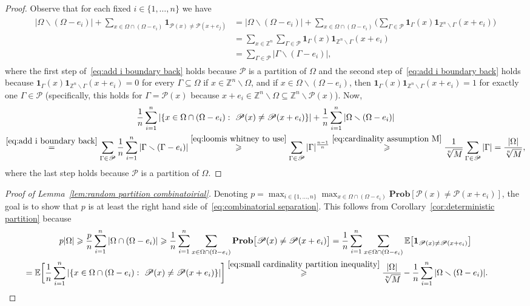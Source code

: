 \documentclass[11pt,reqno]{amsart}
\renewcommand{\ge}{\geqslant}
\renewcommand{\setminus}{\smallsetminus}
\newcommand{\n}{\{1,\ldots,n\}}
\theoremstyle{remark}
\renewcommand{\subset}{\subseteq}
\newcommand{\E}{\mathbb{ E}}
\newcommand{\Z}{\mathbb Z}
\renewcommand{\Pr}{\mathbf{Prob}}
\renewcommand{\1}{\mathbf 1}
\newcommand{\Part}{\mathscr{P}}
\begin{document}
\begin{proof} Observe that for each fixed $i\in \n$ we have
\begin{align}\label{eq:add i boundary back}
\begin{split}
|\Omega\setminus(\Omega-e_i)|+\sum_{x\in \Omega\cap (\Omega-e_i)} \1_{\Part(x)\neq \Part(x+e_j)}&=|\Omega\setminus(\Omega-e_i)|+\sum_{x\in \Omega\cap (\Omega-e_i)} \bigg(\sum_{\Gamma\in \Part} \1_\Gamma(x)\1_{\Z^n\setminus \Gamma}(x+e_i)\bigg)\\&= \sum_{x\in \Z^n} \sum_{\Gamma\in \Part} \1_\Gamma(x)\1_{\Z^n\setminus \Gamma}(x+e_i)\\&=\sum_{\Gamma\in \Part}|\Gamma\setminus(\Gamma-e_i)|,
\end{split}
\end{align}
where the first step of~\eqref{eq:add i boundary back} holds because $\Part$ is a partition of $\Omega$ and  the second step of~\eqref{eq:add i boundary back} holds because $\1_\Gamma(x)\1_{\Z^n\setminus \Gamma}(x+e_i)=0$ for every $\Gamma\subset \Omega$ if $x\in \Z^n\setminus \Omega$, and if $x\in \Omega\setminus(\Omega-e_i)$, then  $\1_\Gamma(x)\1_{\Z^n\setminus \Gamma}(x+e_i)=1$ for exactly one $\Gamma\in \Part$ (specifically, this holds for $\Gamma=\Part(x)$ because   $x+e_i\in \Z^n\setminus \Omega\subset \Z^n\setminus \Part(x)$). Now,
\begin{multline*}
\frac{1}{n}\sum_{i=1}^n|\{x\in \Omega\cap (\Omega-e_i):\  \Part(x)\neq \Part(x+e_i)\}|+\frac{1}{n}\sum_{i=1}^n|\Omega\setminus(\Omega-e_i)|\\\stackrel{\eqref{eq:add i boundary back}}{=}\sum_{\Gamma\in \Part}\frac{1}{n}\sum_{i=1}^n|\Gamma\setminus(\Gamma-e_i)|\stackrel{\eqref{eq:loomis whitney to use}}{\ge} \sum_{\Gamma\in \Part}|\Gamma|^{\frac{n-1}{n}}\stackrel{\eqref{eq:cardinality assumption M}}{\ge} \frac{1}{\sqrt[n]{M}}\sum_{\Gamma\in \Part}|\Gamma|=\frac{|\Omega|}{\sqrt[n]{M}},
\end{multline*}
where the last step holds because $\Part$ is a partition of $\Omega$.
\end{proof}


\begin{proof}[Proof of Lemma~\ref{lem:random partition combinatoirial}] Denoting  $p=\max_{i\in \n}\max_{x\in \Omega\cap (\Omega-e_i)} \Pr[\Part(x)\neq \Part(x+e_i)]$, the goal is to show that $p$ is at least the right hand side of~\eqref{eq:combinatorial separation}. This follows from Corollary~\ref{cor:deterministic partition} because
\begin{multline*}
p|\Omega|\ge \frac{p}{n}\sum_{i=1}^n|\Omega\cap (\Omega-e_i)|\ge  \frac{1}{n}\sum_{i=1}^n\sum_{x\in \Omega\cap (\Omega-e_i)}\Pr\big[\Part(x)\neq \Part(x+e_i)\big]=\frac{1}{n}\sum_{i=1}^n \sum_{x\in \Omega\cap (\Omega-e_i)} \E\big[\1_{\Part(x)\neq \Part(x+e_i)}\big]\\=\E\bigg[\frac{1}{n}\sum_{i=1}^n|\{x\in \Omega\cap (\Omega-e_i):\  \Part(x)\neq \Part(x+e_i)\}|\bigg]\stackrel{\eqref{eq:small cardinality partition inequality}}{\ge} \frac{|\Omega|}{\sqrt[n]{M}}-\frac{1}{n}\sum_{i=1}^n|\Omega\setminus(\Omega-e_i)|.\tag*{\qedhere}
\end{multline*}
\end{proof}
\end{document}
